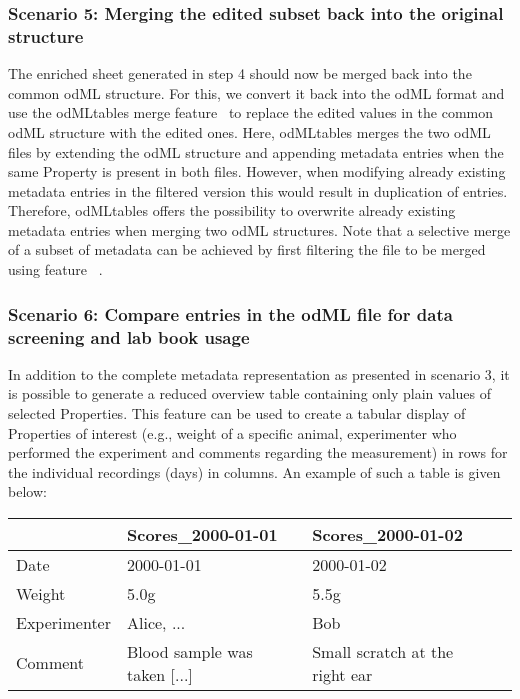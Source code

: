 \subsubsection*{Scenario 5: Merging the edited subset back into the original structure}
The enriched  sheet generated in step 4 should now be merged back into the common odML structure. For this, we convert it back into the odML format and use the odMLtables merge feature \fmerge\ to replace the edited values in the common odML structure with the edited ones. Here, odMLtables merges the two odML files by extending the odML structure and appending metadata entries when the same Property is present in both files. However, when modifying already existing metadata entries in the filtered version this would result in duplication of entries. Therefore, odMLtables offers the possibility to overwrite already existing metadata entries when merging two odML structures. Note that a selective merge of a subset of metadata can be achieved by first filtering the file to be merged using feature \ffilter\ . 


\subsubsection*{Scenario 6: Compare entries in the odML file for data screening and lab book usage}
In addition to the complete metadata representation as presented in scenario 3, it is possible to generate a reduced overview table containing only plain values of selected Properties. This feature can be used to create a tabular display of Properties of interest (e.g., weight of a specific animal, experimenter who performed the experiment and comments regarding the measurement) in rows for the individual recordings (days) in columns. An example of such a table is given below:

\begin{center}
\begin{tabular}{|l||l|l|l|}
\hline
				 & Scores\_2000-01-01 & Scores\_2000-01-02\\
\hline
Date             &  2000-01-01 & 2000-01-02\\
\hline
Weight           &  5.0g & 5.5g\\
\hline
Experimenter     & Alice, ... & Bob\\
\hline
Comment  & Blood sample was taken [...] & Small scratch at the right ear \\
\hline
\end{tabular}
\end{center}


